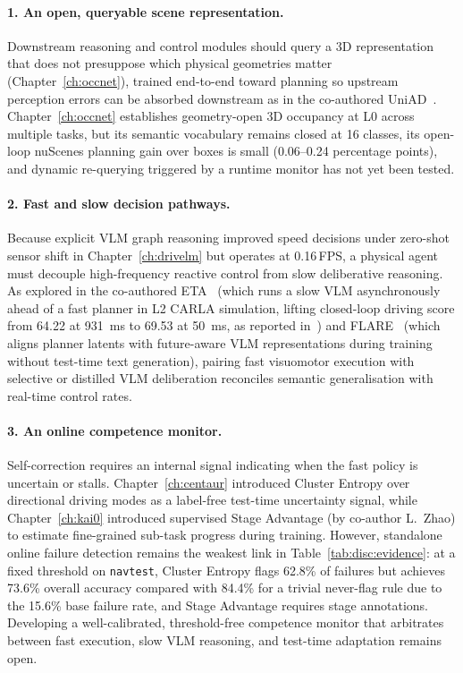 \paragraph{1. An open, queryable scene representation.}
Downstream reasoning and control modules should query a 3D representation that does not presuppose which physical geometries matter (Chapter~\ref{ch:occnet}), trained end-to-end toward planning so upstream perception errors can be absorbed downstream as in the co-authored UniAD~\cite{hu2023uniad}. Chapter~\ref{ch:occnet} establishes geometry-open 3D occupancy at L0 across multiple tasks, but its semantic vocabulary remains closed at 16 classes, its open-loop nuScenes planning gain over boxes is small (0.06--0.24 percentage points), and dynamic re-querying triggered by a runtime monitor has not yet been tested.

\paragraph{2. Fast and slow decision pathways.}
Because explicit VLM graph reasoning improved speed decisions under zero-shot sensor shift in Chapter~\ref{ch:drivelm} but operates at 0.16\,FPS, a physical agent must decouple high-frequency reactive control from slow deliberative reasoning. As explored in the co-authored ETA~\cite{hamdan2025eta} (which runs a slow VLM asynchronously ahead of a fast planner in L2 CARLA simulation, lifting closed-loop driving score from 64.22 at \SI{931}{\milli\second} to 69.53 at \SI{50}{\milli\second}, as reported in~\cite{hamdan2025eta}) and FLARE~\cite{xie2026flare} (which aligns planner latents with future-aware VLM representations during training without test-time text generation), pairing fast visuomotor execution with selective or distilled VLM deliberation reconciles semantic generalisation with real-time control rates.

\paragraph{3. An online competence monitor.}
Self-correction requires an internal signal indicating when the fast policy is uncertain or stalls. Chapter~\ref{ch:centaur} introduced Cluster Entropy over directional driving modes as a label-free test-time uncertainty signal, while Chapter~\ref{ch:kai0} introduced supervised Stage Advantage (by co-author L.~Zhao) to estimate fine-grained sub-task progress during training. However, standalone online failure detection remains the weakest link in Table~\ref{tab:disc:evidence}: at a fixed threshold on \texttt{navtest}, Cluster Entropy flags 62.8\% of failures but achieves 73.6\% overall accuracy compared with 84.4\% for a trivial never-flag rule due to the 15.6\% base failure rate, and Stage Advantage requires stage annotations. Developing a well-calibrated, threshold-free competence monitor that arbitrates between fast execution, slow VLM reasoning, and test-time adaptation remains open.

